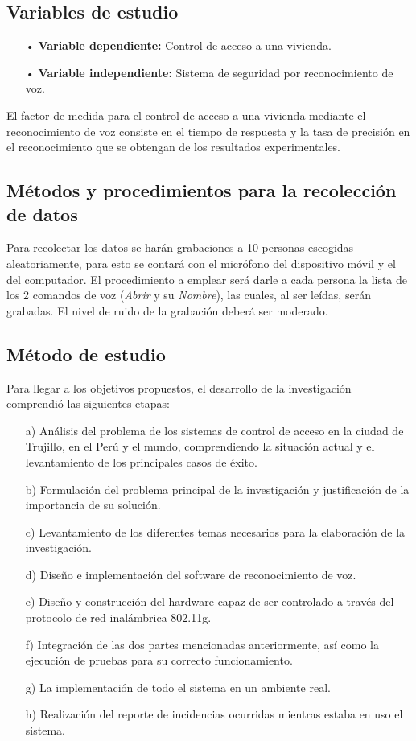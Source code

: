 \subsection{Variables de estudio}
\begin{enumerate}
\item[•]\textbf{Variable dependiente:} Control de acceso a una vivienda.
\item[•]\textbf{Variable independiente:} Sistema de seguridad por reconocimiento de voz.
\end{enumerate}

El factor de medida para el control de acceso a una vivienda mediante el reconocimiento de voz consiste en el tiempo de respuesta y la tasa de precisión en el reconocimiento que se obtengan de los resultados experimentales.

\subsection{Métodos y procedimientos para la recolección de datos}
Para recolectar los datos se harán grabaciones a 10 personas escogidas aleatoriamente, para esto se contará con el micrófono del dispositivo móvil y el del computador. El procedimiento a emplear será darle a cada persona la lista de los 2 comandos de voz (\textit{Abrir} y su \textit{Nombre}), las cuales, al ser leídas, serán grabadas. El nivel de ruido de la grabación deberá ser moderado.

\subsection{Método de estudio}
Para llegar a los objetivos propuestos, el desarrollo de la investigación comprendió las siguientes etapas:
\begin{enumerate}
\item[a)]Análisis del problema de los sistemas de control de acceso en la ciudad de Trujillo, en el Perú y el mundo, comprendiendo la situación actual y el levantamiento de los principales casos de éxito.
\item[b)]Formulación del problema principal de la investigación y justificación de la importancia de su solución.
\item[c)]Levantamiento de los diferentes temas necesarios para la elaboración de la investigación.
\item[d)]Diseño e implementación del software de reconocimiento de voz.
\item[e)]Diseño y construcción del hardware capaz de ser controlado a través del protocolo de red inalámbrica 802.11g.
\item[f)]Integración de las dos partes mencionadas anteriormente, así como la ejecución de pruebas para su correcto funcionamiento.
\item[g)]La implementación de todo el sistema en un ambiente real.
\item[h)]Realización del reporte de incidencias ocurridas mientras estaba en uso el sistema.
\end{enumerate}

